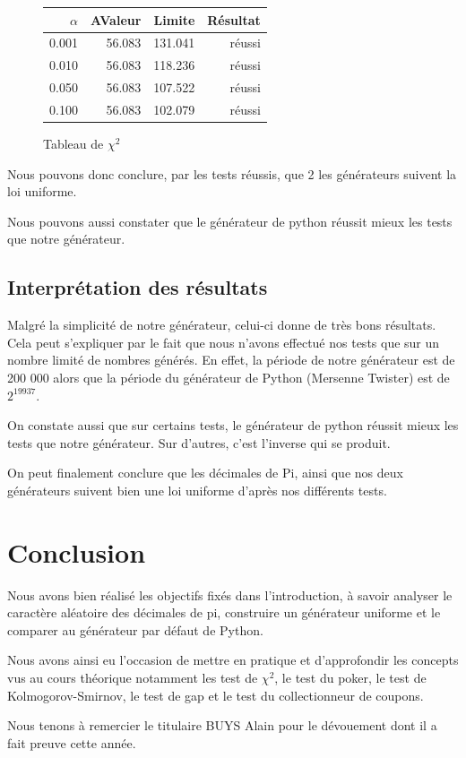\documentclass[10pt,a4paper]{article}
\begin{document}

\begin{figure}[h]
\centering
\begin{tabular}{|r|r|r|r|}
\hline
$\alpha$ & AValeur & Limite & Résultat\\
\hline
0.001 & 56.083 & 131.041 & réussi\\
0.010 & 56.083 & 118.236 & réussi\\
0.050 & 56.083 & 107.522 & réussi\\
0.100 & 56.083 & 102.079 & réussi\\
\hline
\end{tabular}
\caption{Tableau de $\chi^2$}
\end{figure}


Nous pouvons donc conclure, par les tests réussis, que 2 les générateurs suivent la loi uniforme.

Nous pouvons aussi constater que le générateur de python réussit mieux les tests que notre générateur. 
  	
	\newpage
	\subsection{Interprétation des résultats}
	Malgré la simplicité de notre générateur, celui-ci donne de très bons résultats.
	Cela peut s'expliquer par le fait que nous n'avons effectué nos tests que sur un nombre limité de nombres générés. 
	En effet, la période de notre générateur est de 200 000 alors que la période du générateur de Python (Mersenne Twister) est de $2^{19937}$.
	
	On constate aussi que sur certains tests, le générateur de python réussit mieux les tests que notre générateur. Sur d'autres, c'est l'inverse qui se produit.
	
	
	On peut finalement conclure que les décimales de Pi, ainsi que nos deux générateurs suivent bien une loi uniforme d'après nos différents tests.	
	
	\newpage
	\section{Conclusion}
	Nous avons bien réalisé les objectifs fixés dans l'introduction, à savoir analyser le caractère aléatoire des décimales de pi, construire un générateur uniforme et le comparer au générateur par défaut de Python.
	
	Nous avons ainsi eu l'occasion de mettre en pratique et d'approfondir les concepts vus au cours théorique notamment les test de $\chi^2$, le test du poker, le test de Kolmogorov-Smirnov, le test de gap et le test du collectionneur de coupons.
	
	Nous tenons à remercier le titulaire BUYS Alain pour le dévouement dont il a fait preuve cette année.
	
\end{document}
